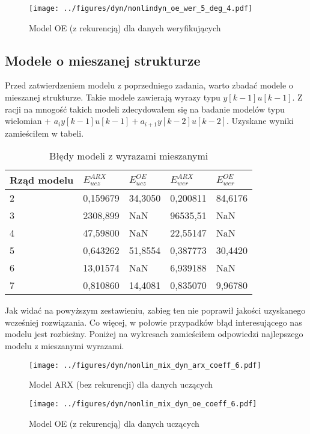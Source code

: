 \documentclass[a4paper,titlepage,11pt,floatssmall]{mwrep}
\begin{document}
\begin{figure}[H]
\centering
\texttt{[image: ../figures/dyn/nonlindyn\_oe\_wer\_5\_deg\_4.pdf]}
\caption{Model OE (z rekurencją) dla danych weryfikujących}
\end{figure}

\subsection{Modele o mieszanej strukturze}
Przed zatwierdzeniem modelu z poprzedniego zadania, warto zbadać modele o mieszanej strukturze. Takie modele zawierają wyrazy typu $y[k-1]u[k-1]$. Z racji na mnogość takich modeli zdecydowałem się na badanie modelów typu wielomian + $a_iy[k-1]u[k-1] + a_{i+1}y[k-2]u[k-2]$. Uzyskane wyniki zamieściłem w tabeli.

\begin{table}[H]
\centering
\caption{Błędy modeli z wyrazami mieszanymi}
\begin{tabular}{|l|l|l|l|l|}
\hline
Rząd modelu & $E_{ucz}^{ARX}$   & $E_{ucz}^{OE}$   & $E_{wer}^{ARX}$   & $E_{wer}^{OE}$   \\ \hline
2           & 0,159679 & 34,3050 & 0,200811 & 84,6176 \\ \hline
3           & 2308,899 & NaN     & 96535,51 & NaN     \\ \hline
4           & 47,59800 & NaN     & 22,55147 & NaN     \\ \hline
5           & 0,643262 & 51,8554 & 0,387773 & 30,4420 \\ \hline
6           & 13,01574 & NaN     & 6,939188 & NaN     \\ \hline
7           & 0,810860 & 14,4081 & 0,835070 & 9,96780 \\ \hline
\end{tabular}
\end{table}

Jak widać na powyższym zestawieniu, zabieg ten nie poprawił jakości uzyskanego wcześniej rozwiązania. Co więcej, w połowie przypadków błąd interesującego nas modelu jest rozbieżny. Poniżej na wykresach zamieściłem odpowiedzi najlepszego modelu z mieszanymi wyrazami.

 \begin{figure}[H]
\centering
\texttt{[image: ../figures/dyn/nonlin\_mix\_dyn\_arx\_coeff\_6.pdf]}
\caption{Model ARX (bez rekurencji) dla danych uczących}
\end{figure}

\begin{figure}[H]
\centering
\texttt{[image: ../figures/dyn/nonlin\_mix\_dyn\_oe\_coeff\_6.pdf]}
\caption{Model OE (z rekurencją) dla danych uczących}
\end{figure}
\end{document}
